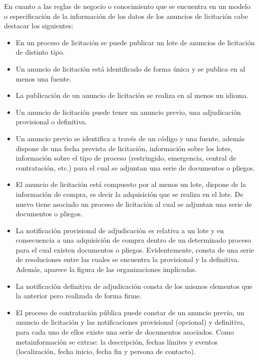 En cuanto a las reglas de negocio o conocimiento que se encuentra en un modelo o especificación 
de la información de los datos de los anuncios de licitación cabe destacar los siguientes:
\begin{itemize}
 \item En un proceso de licitación se puede publicar un lote de anuncios de licitación 
de distinto tipo.
\item Un anuncio de licitación está identificado de forma única y se publica en al menos 
una fuente.
\item La publicación de un anuncio de licitación se realiza en al menos un idioma.
\item Un anuncio de licitación puede tener un anuncio previo, una adjudicación provisional o definitiva.
\item Un anuncio previo se identifica a través de un código y una fuente, además dispone de una fecha 
prevista de licitación, información sobre los lotes, información sobre el tipo de proceso (restringido, 
emergencia, central de contratación, etc.) para el cual se adjuntan una serie de documentos o pliegos.
\item El anuncio de licitación está compuesto por al menos un lote, dispone de la información 
de compra, es decir la adquisición que se realiza en el lote. De nuevo tiene asociado un proceso 
de licitación al cual se adjuntan una serie de documentos o pliegos.
\item La notificación provisional de adjudicación es relativa a un lote y en consecuencia a una 
adquisición de compra dentro de un determinado proceso para el cual existen documentos o pliegos. Evidentemente, 
consta de una serie de resoluciones entre las cuales se encuentra la provisional y la definitiva. Además, aparece 
la figura de las organizaciones implicadas.
\item La notificación definitiva de adjudicación consta de los mismos elementos que la anterior pero realizada 
de forma firme.
\item El proceso de contratación pública puede constar de un anuncio previo, un anuncio de licitación y las notificaciones 
provisional (opcional) y definitiva, para cada uno de ellos existe una serie de documentos asociados. Como metainformación 
se extrae: la descripción, fechas límites y eventos (localización, fecha inicio, fecha fin y persona de contacto).


\end{itemize}

